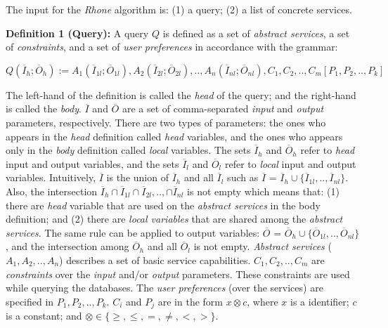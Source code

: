 
%
The input for the \textit{Rhone} algorithm is: (1) a query; (2) a list of concrete services.

\noindent \textbf{Definition 1 (Query):}
A query $Q$ is defined as a set of \textit{abstract services}, a set of \textit{constraints}, and a set of \textit{user preferences} in accordance with the grammar: 

\begin{center}
\small
\begin{math}
Q (\overline{I}_{h}; \overline{O}_{h}) := A_{1}(\overline{I}_{1l}; \overline{O}_{1l}), A_{2}(\overline{I}_{2l}; \overline{O}_{2l}), ..,  A_{n}(\overline{I}_{nl}; \overline{O}_{nl}),C_{1},C_{2}, .., C_{m}[P_{1},P_{2}, .., P_{k}]
\end{math}
\end{center}
%
The left-hand of the definition is called the \textit{head} of the query; and the right-hand is called the \textit{body}. 
%
$\overline{I}$ and $\overline{O}$ are a set of comma-separated \textit{input} and \textit{output} parameters, respectively.
%
There are two types of parameters: the ones who appears in the \textit{head} definition called \textit{head} variables, and the ones who appears only in the \textit{body} definition called \textit{local} variables.
%
The sets $\overline{I}_{h}$ and $\overline{O}_{h}$ refer to \textit{head} input and output variables, 
and the sets $\overline{I}_{l}$ and $\overline{O}_{l}$ refer to \textit{local} input and output variables.
Intuitively, $\overline{I}$ is the union of $\overline{I}_{h}$ and all $\overline{I}_{l}$ such as  
$\overline{I}$ =  $\overline{I}_{h} \cup \lbrace\overline{I}_{1l},..,\overline{I}_{nl}\rbrace$. 
Also, the intersection $\overline{I}_{h} \cap \overline{I}_{1l} \cap \overline{I}_{2l},.., \cap \overline{I}_{nl}$ is not empty which means that: (1) there are \textit{head} variable that are used on the \textit{abstract services} in the body definition; and (2) there are \textit{local variables} that are shared among the \textit{abstract services}. 
The same rule can be applied to output variables: $\overline{O}$ =  $\overline{O}_{h} \cup \lbrace\overline{O}_{1l},..,\overline{O}_{nl}\rbrace$, and the intersection among $\overline{O}_{h}$ and all $\overline{O}_{l}$ is not empty.
% 
\textit{Abstract services} ($A_{1}, A_{2}, .., A_{n}$) describes a set of basic service capabilities.
%
$C_{1}, C_{2}, .., C_{m}$ are \textit{constraints} over the \textit{input} and/or \textit{output} parameters. These constraints are used while querying the databases. 
The \textit{user preferences} (over the services) are specified in $P_{1}, P_{2}, .., P_{k}$.  
%
$C_{i}$ and $P_{j}$ are in the form $x \otimes c$, where $x$ is a identifier; $c$ is a constant; and
$\otimes \in\lbrace \geq, \leq, =, \neq, <, >\rbrace$.

